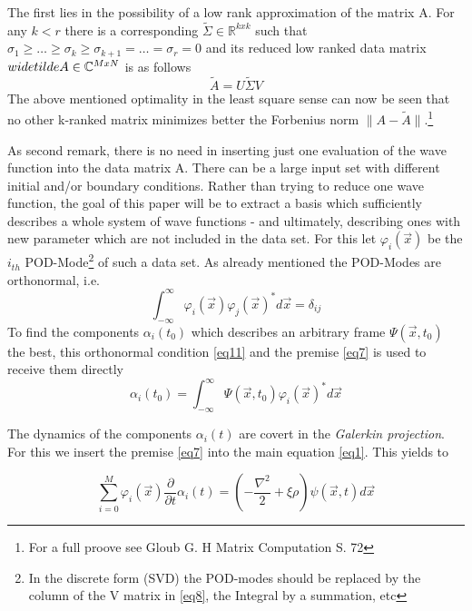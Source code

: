 \documentclass[usenatbib]{mn2e}
\begin{document}
The first lies in the possibility of a low rank approximation of the matrix A. For any \(k<r\) there is a corresponding \(\widetilde{\Sigma} \in \mathbb{R}^{kxk} \) such that \(\sigma_1 \geq \dots \geq \sigma_k \geq \sigma_{k+1} = \dots = \sigma_r =0\) and its reduced low ranked data matrix \(\\widetilde{A} \in \mathbb{C}^{MxN} \) is as follows
\begin{equation}\label{eq10}
\widetilde{A}=U \widetilde{\Sigma} V
\end{equation} 
The above mentioned optimality in the least square sense can now be seen that no other k-ranked matrix minimizes better the Forbenius norm \(\| A-\widetilde{A} \|\).\footnote{For a full proove see Gloub G. H  Matrix Computation S. 72}

 As second remark, there is no need in inserting just one evaluation of the wave function into the data matrix A. There can be a large input set with different initial and/or boundary conditions. Rather than trying to reduce one wave function, the goal of this paper will be to extract a basis which sufficiently  describes a whole system of wave functions - and ultimately, describing ones with new parameter which are not included in the data set. For this let \(\varphi_i(\overrightarrow{x})\) be the \(i_{th}\) POD-Mode\footnote{In the discrete form (SVD) the POD-modes should be replaced by the column of the V matrix in \ref{eq8}, the Integral by a summation, etc}
 of such a data set. As already mentioned the POD-Modes are orthonormal, i.e.
 \begin{equation}\label{eq11}
\int_{-\infty}^\infty \varphi_i(\overrightarrow{x})  \varphi_j(\overrightarrow{x})^* d\overrightarrow{x} = \delta_{ij} 
\end{equation} 
To find the components \(\alpha_i(t_0)\) which describes an arbitrary frame \(\Psi(\overrightarrow{x},t_0)\) the best, this orthonormal condition \ref{eq11} and the premise \ref{eq7} is used to receive them directly
 \begin{equation}\label{eq12}
\alpha_i(t_0) =\int_{-\infty}^\infty \Psi(\overrightarrow{x},t_0) \varphi_i(\overrightarrow{x})^* d\overrightarrow{x}
\end{equation} 

The dynamics of the components \(\alpha_i(t)\) are covert in the \textit{Galerkin projection}. For this we insert the premise \ref{eq7} into the main equation \ref{eq1}. This yields to

 \begin{equation}\label{eq12}
\sum_{i=0}^M \varphi_i(\overrightarrow{x}) \dfrac {\partial } {\partial t} \alpha_i(t) =( -\dfrac {\nabla ^{2}} {2}+ \xi \rho) \psi( \overrightarrow {x},t)d\overrightarrow{x}
\end{equation} 





\def\aap{A\&A}
\def\araa{ARA\&A}
\def\apjl{APJL}
\def\mnras{MNRAS}
\def\nat{Nature}
\def\prd{Phys Rev D}


\end{document}
